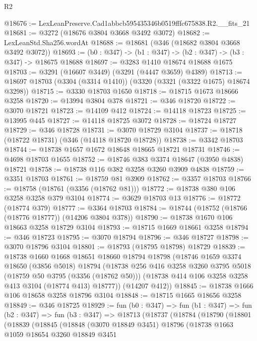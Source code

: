 \begin{lexlean}{R2}
\begin{coremodule}
@18676 := LexLeanPreserve.Cad1abbcb595435346b0519fffc675838.R2.__fits_21
@18681 := @3272 (@18676 @3804 @3668 @3492 @3072)
@18682 := LexLeanStd.Sha256.wordAt
@18688 := @18681 (@346 (@18682 @3804 @3668 @3492 @3072))
@18693 := (b0 : @347) -> (b1 : @347) -> (b2 : @347) -> (b3 : @347) -> @18675 @18688
@18697 := @3283 @1410 @18674 @18688 @1675
@18703 := @3291 (@16607 @3449) (@3291 (@4447 @3659) @4389)
@18713 := @18697 @18703 (@3304 (@3314 @1410)) (@3320 (@3321 (@3322 @1675) @18674 @3298))
@18715 := @3330 @18703 @1650
@18718 := @18715 @1673 @18666 @3258
@18720 := @13994 @3804 @378
@18721 := @346 @18720
@18722 := @3070 @18721
@18723 := @14109 @412
@18724 := @14118 @18723
@18725 := @13995 @445
@18727 := @14118 @18725 @3072
@18728 := @18724 @18727
@18729 := @346 @18728
@18731 := @3070 @18729 @3104
@18737 := @18718 (@18722 @18731) (@346 (@14118 @18720 @18728))
@18738 := @3342 @18703
@18744 := @18738 @1657 @1672 @18648 @18665 @18721 @18731
@18746 := @4698 @18703 @1655
@18752 := @18746 @383 @3374 @18647 (@3950 @4838) @18721
@18758 := @18738 @116 @382 @3258 @3260 @3909 @4838
@18759 := @3351 @18703
@18761 := @18759 @81 @3909
@18762 := @3357 @18703
@18766 := @18758 (@18761 (@3356 (@18762 @81)))
@18772 := @18738 @380 @106 @3258 @3258 @379 @3104
@18774 := @3629 @18703 @13
@18776 := @18772 (@18774 @379)
@18777 := @3364 @18703
@18784 := @18744 (@18752 (@18766 (@18776 @18777)) (@14206 @3804 @378))
@18790 := @18738 @1670 @106 @18663 @3258 @18729 @3104
@18793 := @18715 @1669 @18661 @3258
@18794 := @346 @18723
@18795 := @3070 @18794
@18796 := @346 @18727
@18798 := @3070 @18796 @3104
@18801 := @18793 (@18795 @18798) @18729
@18839 := @18738
    @1660
    @1668
    @18651
    @18660
    @18794
    @18798
    (@18746
      @1659
      @3374
      @18650
      (@3856 @5018)
      @18794
      (@18738
        @256
        @416
        @3258
        @3260
        @3795
        @5018
        (@18759 @50 @3795 (@3356 (@18762 @50)))
        (@18738 @414 @106 @3258 @3258 @413 @3104 (@18774 @413) @18777))
      (@14207 @412))
@18845 := @18738 @1666 @106 @18658 @3258 @18796 @3104
@18848 := @18715 @1665 @18656 @3258
@18849 := @346 @18725
@18929 := fun (b0 : @347) =>
  fun (b1 : @347) =>
  fun (b2 : @347) =>
  fun (b3 : @347) =>
  @18713
    (@18737
      (@18784
        (@18790
          (@18801
            (@18839
              (@18845
                (@18848
                  (@3070 @18849 @3451)
                  @18796
                  (@18738
                    @1663
                    @1059
                    @18654
                    @3260
                    @18849
                    @3451

\end{coremodule}
\end{lexlean}
